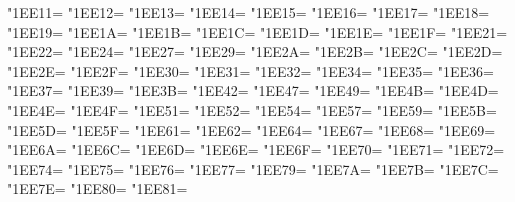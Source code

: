 \XeTeXcharclass"1EE11=\KclassArabU
\XeTeXcharclass"1EE12=\KclassArabU
\XeTeXcharclass"1EE13=\KclassArabU
\XeTeXcharclass"1EE14=\KclassArabU
\XeTeXcharclass"1EE15=\KclassArabU
\XeTeXcharclass"1EE16=\KclassArabU
\XeTeXcharclass"1EE17=\KclassArabU
\XeTeXcharclass"1EE18=\KclassArabU
\XeTeXcharclass"1EE19=\KclassArabU
\XeTeXcharclass"1EE1A=\KclassArabU
\XeTeXcharclass"1EE1B=\KclassArabU
\XeTeXcharclass"1EE1C=\KclassArabU
\XeTeXcharclass"1EE1D=\KclassArabU
\XeTeXcharclass"1EE1E=\KclassArabU
\XeTeXcharclass"1EE1F=\KclassArabU
\XeTeXcharclass"1EE21=\KclassArabU
\XeTeXcharclass"1EE22=\KclassArabU
\XeTeXcharclass"1EE24=\KclassArabU
\XeTeXcharclass"1EE27=\KclassArabU
\XeTeXcharclass"1EE29=\KclassArabU
\XeTeXcharclass"1EE2A=\KclassArabU
\XeTeXcharclass"1EE2B=\KclassArabU
\XeTeXcharclass"1EE2C=\KclassArabU
\XeTeXcharclass"1EE2D=\KclassArabU
\XeTeXcharclass"1EE2E=\KclassArabU
\XeTeXcharclass"1EE2F=\KclassArabU
\XeTeXcharclass"1EE30=\KclassArabU
\XeTeXcharclass"1EE31=\KclassArabU
\XeTeXcharclass"1EE32=\KclassArabU
\XeTeXcharclass"1EE34=\KclassArabU
\XeTeXcharclass"1EE35=\KclassArabU
\XeTeXcharclass"1EE36=\KclassArabU
\XeTeXcharclass"1EE37=\KclassArabU
\XeTeXcharclass"1EE39=\KclassArabU
\XeTeXcharclass"1EE3B=\KclassArabU
\XeTeXcharclass"1EE42=\KclassArabU
\XeTeXcharclass"1EE47=\KclassArabU
\XeTeXcharclass"1EE49=\KclassArabU
\XeTeXcharclass"1EE4B=\KclassArabU
\XeTeXcharclass"1EE4D=\KclassArabU
\XeTeXcharclass"1EE4E=\KclassArabU
\XeTeXcharclass"1EE4F=\KclassArabU
\XeTeXcharclass"1EE51=\KclassArabU
\XeTeXcharclass"1EE52=\KclassArabU
\XeTeXcharclass"1EE54=\KclassArabU
\XeTeXcharclass"1EE57=\KclassArabU
\XeTeXcharclass"1EE59=\KclassArabU
\XeTeXcharclass"1EE5B=\KclassArabU
\XeTeXcharclass"1EE5D=\KclassArabU
\XeTeXcharclass"1EE5F=\KclassArabU
\XeTeXcharclass"1EE61=\KclassArabU
\XeTeXcharclass"1EE62=\KclassArabU
\XeTeXcharclass"1EE64=\KclassArabU
\XeTeXcharclass"1EE67=\KclassArabU
\XeTeXcharclass"1EE68=\KclassArabU
\XeTeXcharclass"1EE69=\KclassArabU
\XeTeXcharclass"1EE6A=\KclassArabU
\XeTeXcharclass"1EE6C=\KclassArabU
\XeTeXcharclass"1EE6D=\KclassArabU
\XeTeXcharclass"1EE6E=\KclassArabU
\XeTeXcharclass"1EE6F=\KclassArabU
\XeTeXcharclass"1EE70=\KclassArabU
\XeTeXcharclass"1EE71=\KclassArabU
\XeTeXcharclass"1EE72=\KclassArabU
\XeTeXcharclass"1EE74=\KclassArabU
\XeTeXcharclass"1EE75=\KclassArabU
\XeTeXcharclass"1EE76=\KclassArabU
\XeTeXcharclass"1EE77=\KclassArabU
\XeTeXcharclass"1EE79=\KclassArabU
\XeTeXcharclass"1EE7A=\KclassArabU
\XeTeXcharclass"1EE7B=\KclassArabU
\XeTeXcharclass"1EE7C=\KclassArabU
\XeTeXcharclass"1EE7E=\KclassArabU
\XeTeXcharclass"1EE80=\KclassArabU
\XeTeXcharclass"1EE81=\KclassArabU
